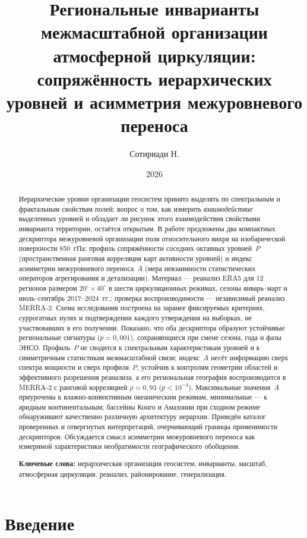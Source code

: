 \documentclass[11pt,a4paper]{article}
\title{Региональные инварианты межмасштабной организации атмосферной циркуляции:\\
сопряжённость иерархических уровней и асимметрия межуровневого переноса}
\author{Сотириади Н.}
\date{2026}
\begin{document}
\maketitle

\begin{abstract}
Иерархические уровни организации геосистем принято выделять по спектральным и фрактальным свойствам полей; вопрос о том, как измерить \emph{взаимодействие} выделенных уровней и обладает ли рисунок этого взаимодействия свойствами инварианта территории, остаётся открытым. В работе предложены два компактных дескриптора межуровневой организации поля относительного вихря на изобарической поверхности 850~гПа: профиль сопряжённости соседних октавных уровней~$P$ (пространственная ранговая корреляция карт активности уровней) и индекс асимметрии межуровневого переноса~$A$ (мера невзаимности статистических операторов агрегирования и детализации). Материал --- реанализ ERA5 для 12 регионов размером $20^\circ\times40^\circ$ в шести циркуляционных режимах, сезоны январь--март и июль--сентябрь 2017--2024~гг.; проверка воспроизводимости --- независимый реанализ MERRA-2. Схема исследования построена на заранее фиксируемых критериях, суррогатных нулях и подтверждении каждого утверждения на выборках, не участвовавших в его получении. Показано, что оба дескриптора образуют устойчивые региональные сигнатуры ($p=0{,}001$), сохраняющиеся при смене сезона, года и фазы ЭНСО. Профиль~$P$ не сводится к спектральным характеристикам уровней и к симметричным статистикам межмасштабной связи; индекс~$A$ несёт информацию сверх спектра мощности и сверх профиля~$P$, устойчив к контролям геометрии областей и эффективного разрешения реанализа, а его региональная география воспроизводится в MERRA-2 с ранговой корреляцией $\rho=0{,}93$ ($p<10^{-4}$). Максимальные значения~$A$ приурочены к влажно-конвективным океаническим режимам, минимальные --- к аридным континентальным; бассейны Конго и Амазонии при сходном режиме обнаруживают качественно различную архитектуру иерархии. Приведён каталог проверенных и отвергнутых интерпретаций, очерчивающий границы применимости дескрипторов. Обсуждается смысл асимметрии межуровневого переноса как измеримой характеристики необратимости географического обобщения.

\smallskip
\noindent\textbf{Ключевые слова:} иерархическая организация геосистем, инварианты, масштаб, атмосферная циркуляция, реанализ, районирование, генерализация.
\end{abstract}

\section{Введение}
\label{sec:intro}
\end{document}
